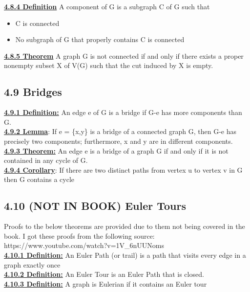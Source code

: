\documentclass[12pt]{article}
\newcommand{\myt}[1]{\textbf{\underline{#1}}}
\begin{document}
	\myt{4.8.4 Definition} A component of G is a subgraph C of G such that\\
	\begin{itemize}
		\item C is connected
		\item No subgraph of G that properly contains C is connected
	\end{itemize}
	
	\myt{4.8.5 Theorem} A graph G is not connected if and only if there exists a proper nonempty subset X of V(G) such that the cut induced by X is empty.\\
	
	\subsection*{4.9 Bridges}
	\myt{4.9.1 Definition:} An edge e of G is a bridge if G-e has more components than G.\\
	
	\myt{4.9.2 Lemma}: If e = \{x,y\} is a bridge of a connected graph G, then G-e has precisely two components; furthermore, x and y are in different components.\\
	
	\myt{4.9.3 Theorem:} An edge e is a bridge of a graph G if and only if it is not contained in any cycle of G.\\
	
	\myt{4.9.4 Corollary}: If there are two distinct paths from vertex u to vertex v in G then G contains a cycle\\
	
	\subsection*{4.10 (NOT IN BOOK) Euler Tours}
	Proofs to the below theorems are provided due to them not being covered in the book. I got these proofs from the following source:\\
	https://www.youtube.com/watch?v=1V\_6nUUNoms \\
	
	\myt{4.10.1 Definition:} An Euler Path (or trail) is a path that visits every edge in a graph exactly once\\
	\myt{4.10.2 Definition:} An Euler Tour is an Euler Path that is closed.\\
	\myt{4.10.3 Definition:} A graph is Eulerian if it contains an Euler tour\\
	
\end{document}
